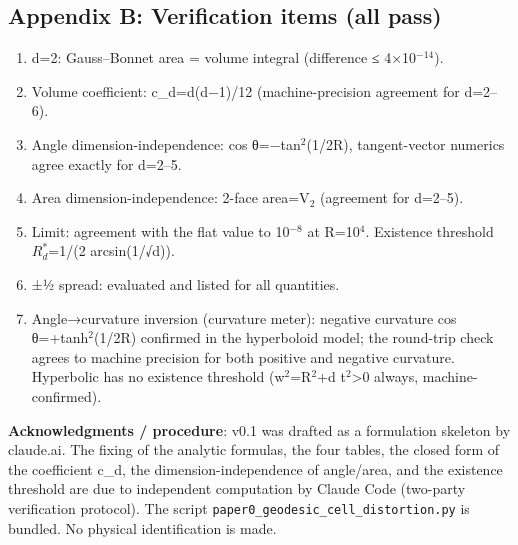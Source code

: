 \documentclass[
]{ltjsarticle}
\providecommand{\tightlist}{%
  \setlength{\itemsep}{0pt}\setlength{\parskip}{0pt}}
\begin{document}
\subsection{Appendix B: Verification items (all
pass)}\label{appendix-b-verification-items-all-pass}

\begin{enumerate}
\def\labelenumi{\arabic{enumi}.}
\tightlist
\item
  d=2: Gauss--Bonnet area = volume integral (difference ≤
  4×10\(^{-14}\)).
\item
  Volume coefficient: c\_d=d(d−1)/12 (machine-precision agreement for
  d=2--6).
\item
  Angle dimension-independence: cos θ=−tan\(^{2}\)(1/2R), tangent-vector
  numerics agree exactly for d=2--5.
\item
  Area dimension-independence: 2-face area=V\(_{2}\) (agreement for
  d=2--5).
\item
  Limit: agreement with the flat value to 10\(^{-8}\) at R=10\(^{4}\).
  Existence threshold \(R^{*}_{d}\)=1/(2 arcsin(1/√d)).
\item
  ±½ spread: evaluated and listed for all quantities.
\item
  Angle→curvature inversion (curvature meter): negative curvature cos
  θ=+tanh\(^{2}\)(1/2R) confirmed in the hyperboloid model; the
  round-trip check agrees to machine precision for both positive and
  negative curvature. Hyperbolic has no existence threshold
  (w\(^{2}\)=R\(^{2}\)+d t\(^{2}\)\textgreater0 always,
  machine-confirmed).
\end{enumerate}

\textbf{Acknowledgments / procedure}: v0.1 was drafted as a formulation
skeleton by claude.ai. The fixing of the analytic formulas, the four
tables, the closed form of the coefficient c\_d, the
dimension-independence of angle/area, and the existence threshold are
due to independent computation by Claude Code (two-party verification
protocol). The script \texttt{paper0\_geodesic\_cell\_distortion.py} is
bundled. No physical identification is made.
\end{document}
